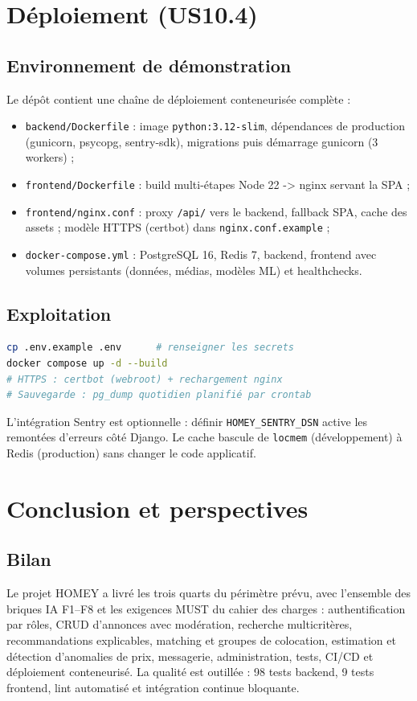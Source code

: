 \documentclass[11pt,a4paper]{report}
\begin{document}
\chapter{Déploiement (US10.4)}

\section{Environnement de démonstration}
Le dépôt contient une chaîne de déploiement conteneurisée complète :
\begin{itemize}[leftmargin=*]
  \item \texttt{backend/Dockerfile} : image \texttt{python:3.12-slim}, dépendances de production
        (gunicorn, psycopg, sentry-sdk), migrations puis démarrage gunicorn (3 workers) ;
  \item \texttt{frontend/Dockerfile} : build multi-étapes Node 22 -> nginx servant la SPA ;
  \item \texttt{frontend/nginx.conf} : proxy \texttt{/api/} vers le backend, fallback SPA,
        cache des assets ; modèle HTTPS (certbot) dans \texttt{nginx.conf.example} ;
  \item \texttt{docker-compose.yml} : PostgreSQL 16, Redis 7, backend, frontend avec volumes
        persistants (données, médias, modèles ML) et healthchecks.
\end{itemize}

\section{Exploitation}
\begin{lstlisting}[language=bash]
cp .env.example .env      # renseigner les secrets
docker compose up -d --build
# HTTPS : certbot (webroot) + rechargement nginx
# Sauvegarde : pg_dump quotidien planifié par crontab
\end{lstlisting}
L'intégration Sentry est optionnelle : définir \texttt{HOMEY\_SENTRY\_DSN} active les remontées
d'erreurs côté Django. Le cache bascule de \texttt{locmem} (développement) à Redis (production)
sans changer le code applicatif.

\chapter{Conclusion et perspectives}

\section{Bilan}
Le projet HOMEY a livré les trois quarts du périmètre prévu, avec l'ensemble des briques IA
F1--F8 et les exigences MUST du cahier des charges : authentification par rôles, CRUD d'annonces
avec modération, recherche multicritères, recommandations explicables, matching et groupes de
colocation, estimation et détection d'anomalies de prix, messagerie, administration, tests,
CI/CD et déploiement conteneurisé. La qualité est outillée : 98 tests backend, 9 tests frontend,
lint automatisé et intégration continue bloquante.
\end{document}
